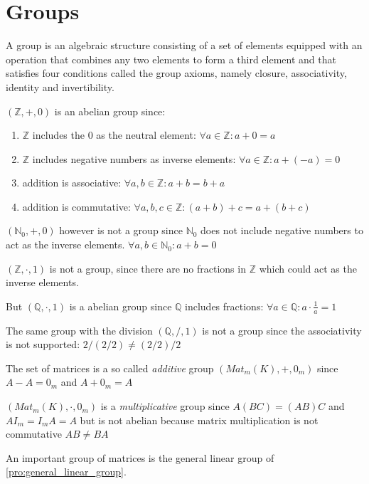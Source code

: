\section{Groups}
A group is an algebraic structure consisting of a set of elements equipped with an operation that combines any two elements to form a third element and that satisfies four conditions called the group axioms, namely closure, associativity, identity and invertibility.

\begin{example}[Integers]
   \((\mathbb{Z}, +, 0)\) is an abelian group since:
   \begin{enumerate}
      \item \(\mathbb{Z}\) includes the 0 as the neutral element: \(\forall a \in \mathbb{Z}: a + 0 = a\)
      \item \(\mathbb{Z}\) includes negative numbers as inverse elements: \(\forall a \in \mathbb{Z}: a + (-a) = 0\)
      \item addition is associative: \(\forall a, b \in \mathbb{Z}: a + b = b + a\)
      \item addition is commutative: \(\forall a, b, c \in \mathbb{Z}: (a + b) + c = a + (b + c)\)
   \end{enumerate}

   \((\mathbb{N}_{0}, +, 0)\) however is not a group since \(\mathbb{N}_{0}\) does not include negative numbers to act as the inverse elements.
   \(\forall a, b \in \mathbb{N}_{0}: a + b = 0\)
\end{example}

\begin{example}
   \((\mathbb{Z}, \cdot, 1)\) is not a group, since there are no fractions in \(\mathbb{Z}\) which could act as the inverse elements.

   But \((\mathbb{Q}, \cdot, 1)\) is a abelian group since \(\mathbb{Q}\) includes fractions: \(\forall a \in \mathbb{Q}: a \cdot \frac{1}{a} = 1\)

   The same group with the division \((\mathbb{Q}, /, 1)\) is not a group since the associativity is not supported: \(2 / (2 / 2) \neq (2 / 2) / 2\)
\end{example}

\begin{example}[Matrices]
   The set of matrices is a so called \textit{additive} group \((Mat_{m}(K), +, 0_m)\) since \(A-A = 0_m\) and \(A + 0_m = A\)

   \((Mat_{m}(K), \cdot, 0_m)\) is a \textit{multiplicative} group since \(A(BC)=(AB)C\) and \(AI_m = I_mA = A\) but is not abelian because matrix multiplication is not commutative \(AB \neq BA\)

   An important group of matrices is the general linear group of \cref{pro:general_linear_group}.
\end{example}

